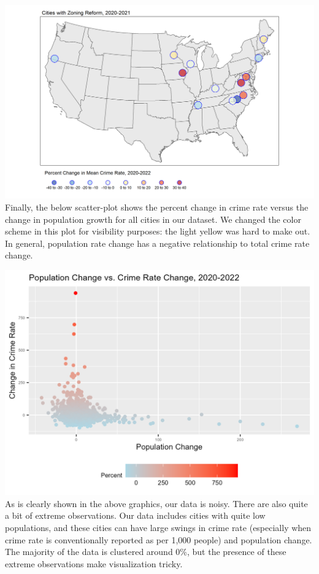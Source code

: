 \documentclass[
  12pt,
]{article}
\begin{document}
\includegraphics{Plots/Cities_ratechange.png} Finally, the below
scatter-plot shows the percent change in crime rate versus the change in
population growth for all cities in our dataset. We changed the color
scheme in this plot for visibility purposes: the light yellow was hard
to make out. In general, population rate change has a negative
relationship to total crime rate change.

\includegraphics{Plots/Cities_Scatter.png} As is clearly shown in the
above graphics, our data is noisy. There are also quite a bit of extreme
observations. Our data includes cities with quite low populations, and
these cities can have large swings in crime rate (especially when crime
rate is conventionally reported as per 1,000 people) and population
change. The majority of the data is clustered around 0\%, but the
presence of these extreme observations make visualization tricky.
\end{document}
